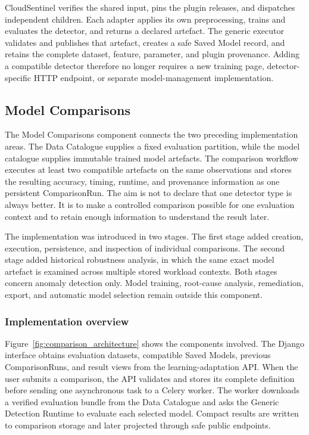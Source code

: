 CloudSentinel verifies the shared input, pins the plugin releases, and dispatches independent children. Each adapter applies its own preprocessing, trains and evaluates the detector, and returns a declared artefact. The generic executor validates and publishes that artefact, creates a safe Saved Model record, and retains the complete dataset, feature, parameter, and plugin provenance. Adding a compatible detector therefore no longer requires a new training page, detector-specific HTTP endpoint, or separate model-management implementation.

\subsection{Model Comparisons}

The Model Comparisons component connects the two preceding implementation areas. The Data Catalogue supplies a fixed evaluation partition, while the model catalogue supplies immutable trained model artefacts. The comparison workflow executes at least two compatible artefacts on the same observations and stores the resulting accuracy, timing, runtime, and provenance information as one persistent ComparisonRun. The aim is not to declare that one detector type is always better. It is to make a controlled comparison possible for one evaluation context and to retain enough information to understand the result later.

The implementation was introduced in two stages. The first stage added creation, execution, persistence, and inspection of individual comparisons. The second stage added historical robustness analysis, in which the same exact model artefact is examined across multiple stored workload contexts. Both stages concern anomaly detection only. Model training, root-cause analysis, remediation, export, and automatic model selection remain outside this component.

\subsubsection{Implementation overview}

Figure~\ref{fig:comparison_architecture} shows the components involved. The Django interface obtains evaluation datasets, compatible Saved Models, previous ComparisonRuns, and result views from the learning-adaptation API. When the user submits a comparison, the API validates and stores its complete definition before sending one asynchronous task to a Celery worker. The worker downloads a verified evaluation bundle from the Data Catalogue and asks the Generic Detection Runtime to evaluate each selected model. Compact results are written to comparison storage and later projected through safe public endpoints.

